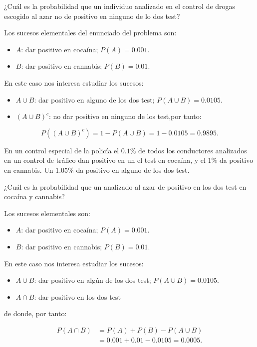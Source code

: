 \documentclass[
  letterpaper,
  DIV=11,
  numbers=noendperiod]{scrreprt}
\providecommand{\tightlist}{%
  \setlength{\itemsep}{0pt}\setlength{\parskip}{0pt}}\usepackage{longtable,booktabs,array}
\begin{document}
¿Cuál es la probabilidad que un individuo analizado en el control de
drogas escogido al azar no de positivo en ninguno de lo dos test?

Los sucesos elementales del enunciado del problema son:

\begin{itemize}
\tightlist
\item
  \(A\): dar positivo en cocaína; \(P(A)=0.001.\)
\item
  \(B\): dar positivo en cannabis; \(P(B)=0.01.\)
\end{itemize}

En este caso nos interesa estudiar los sucesos:

\begin{itemize}
\tightlist
\item
  \(A\cup B\): dar positivo en alguno de los dos test;
  \(P(A\cup B)=0.0105.\)
\item
  \((A\cup B)^c\): no dar positivo en ninguno de los test,por tanto:
\end{itemize}

\[P((A\cup B)^c)=1-P(A\cup B)=1-0.0105=0.9895.\]

En un control especial de la policía el \(0.1\%\) de todos los
conductores analizados en un control de tráfico dan positivo en un el
test en cocaína, y el \(1\%\) da positivo en cannabis. Un \(1.05\%\) da
positivo en alguno de los dos test.

¿Cuál es la probabilidad que un analizado al azar de positivo en los dos
test en cocaína y cannabis?

Los sucesos elementales son:

\begin{itemize}
\tightlist
\item
  \(A\): dar positivo en cocaína; \(P(A)=0.001.\)
\item
  \(B\): dar positivo en cannabis; \(P(B)=0.01.\)
\end{itemize}

En este caso nos interesa estudiar los sucesos:

\begin{itemize}
\tightlist
\item
  \(A\cup B\): dar positivo en algún de los dos test;
  \(P(A\cup B)=0.0105.\)
\item
  \(A\cap B\): dar positivo en los dos test
\end{itemize}

de donde, por tanto:

\[\begin{array}{rl}
{P(A\cap B)} &{=P(A)+P(B)-P(A\cup B)}\\ &{=0.001+0.01-0.0105=0.0005}.
\end{array}\]
\end{document}
